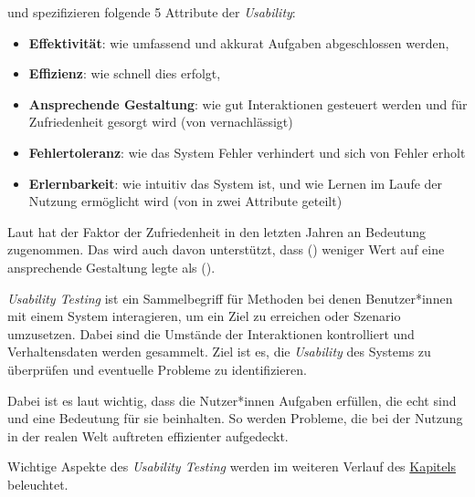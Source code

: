 \citeauthor{quesenberyDimensionsUsability2003} \cite{quesenberyDimensionsUsability2003} und \citeauthor{nielsenUsabilityEngineering1994} \cite{nielsenUsabilityEngineering1994} spezifizieren folgende 5 Attribute der \textit{Usability}:
\begin{itemize}
  \item \textbf{Effektivität}: wie umfassend und akkurat Aufgaben abgeschlossen werden,
  \item \textbf{Effizienz}: wie schnell dies erfolgt,
  \item \textbf{Ansprechende Gestaltung}: wie gut Interaktionen gesteuert werden und für Zufriedenheit gesorgt wird (von \citeauthor{nielsenUsabilityEngineering1994} vernachlässigt)
  \item \textbf{Fehlertoleranz}: wie das System Fehler verhindert und sich von Fehler erholt
  \item \textbf{Erlernbarkeit}: wie intuitiv das System ist, und wie Lernen im Laufe der Nutzung ermöglicht wird (von \citeauthor{nielsenUsabilityEngineering1994} in zwei Attribute geteilt)
\end{itemize}

Laut \citeauthor{barnumUsabilityTesting2021} \cite{barnumUsabilityTesting2021} hat der Faktor der Zufriedenheit in den letzten Jahren an Bedeutung zugenommen. Das wird auch davon unterstützt, dass \citeauthor{nielsenUsabilityEngineering1994} (\citeyear{nielsenUsabilityEngineering1994}) weniger Wert auf eine ansprechende Gestaltung legte als \citeauthor{quesenberyDimensionsUsability2003} (\citeyear{quesenberyDimensionsUsability2003}).

\newpage

\textit{Usability Testing} ist ein Sammelbegriff für Methoden bei denen Benutzer*innen mit einem System interagieren, um ein Ziel zu erreichen oder Szenario umzusetzen. Dabei sind die Umstände der Interaktionen kontrolliert und Verhaltensdaten werden gesammelt. \cite{wichanskyUsabilityTesting2000}
Ziel ist es, die \textit{Usability} des Systems zu überprüfen und eventuelle Probleme zu identifizieren.

Dabei ist es laut \citeauthor{barnumUsabilityTesting2021} \cite{barnumUsabilityTesting2021} wichtig, dass die Nutzer*innen Aufgaben erfüllen, die echt sind und eine Bedeutung für sie beinhalten. So werden Probleme, die bei der Nutzung in der realen Welt auftreten effizienter aufgedeckt.

Wichtige Aspekte des \textit{Usability Testing} werden im weiteren Verlauf des \hyperref[sec:usability-testing]{Kapitels} beleuchtet.
